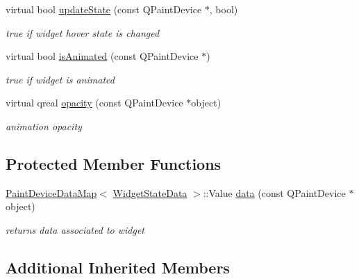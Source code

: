\begin{DoxyCompactItemize}
\mbox{\label{class_splitter_engine_a6d4ca72662cd77c317aceda411e97323}} 
virtual bool \hyperlink{class_splitter_engine_a6d4ca72662cd77c317aceda411e97323}{update\+State} (const Q\+Paint\+Device $\ast$, bool)
\begin{DoxyCompactList}\small\item\em true if widget hover state is changed \end{DoxyCompactList}\item 
\mbox{\label{class_splitter_engine_ab859f530a4cb831ea70d1b3267f04ece}} 
virtual bool \hyperlink{class_splitter_engine_ab859f530a4cb831ea70d1b3267f04ece}{is\+Animated} (const Q\+Paint\+Device $\ast$)
\begin{DoxyCompactList}\small\item\em true if widget is animated \end{DoxyCompactList}\item 
\mbox{\label{class_splitter_engine_aa0299e7878132a11a175c5cf790d2b8b}} 
virtual qreal \hyperlink{class_splitter_engine_aa0299e7878132a11a175c5cf790d2b8b}{opacity} (const Q\+Paint\+Device $\ast$object)
\begin{DoxyCompactList}\small\item\em animation opacity \end{DoxyCompactList}\end{DoxyCompactItemize}
\subsection*{Protected Member Functions}
\begin{DoxyCompactItemize}
\item 
\mbox{\label{class_splitter_engine_a2bb7aee79b0dca300c30c619c1a8a20a}} 
\hyperlink{class_paint_device_data_map}{Paint\+Device\+Data\+Map}$<$ \hyperlink{class_widget_state_data}{Widget\+State\+Data} $>$\+::Value \hyperlink{class_splitter_engine_a2bb7aee79b0dca300c30c619c1a8a20a}{data} (const Q\+Paint\+Device $\ast$object)
\begin{DoxyCompactList}\small\item\em returns data associated to widget \end{DoxyCompactList}\end{DoxyCompactItemize}
\subsection*{Additional Inherited Members}


